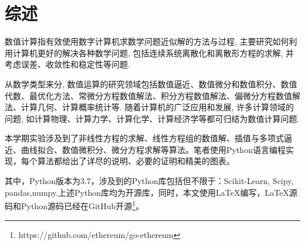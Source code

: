 \section{综述}

数值计算指有效使用数字计算机求数学问题近似解的方法与过程, 主要研究如何利用计算机更好的解决各种数学问题, 包括连续系统离散化和离散形方程的求解, 并考虑误差、收敛性和稳定性等问题.

从数学类型来分, 数值运算的研究领域包括数值逼近、数值微分和数值积分、数值代数、最优化方法、常微分方程数值解法、积分方程数值解法、偏微分方程数值解法、计算几何、计算概率统计等. 随着计算机的广泛应用和发展, 许多计算领域的问题, 如计算物理、计算力学、计算化学、计算经济学等都可归结为数值计算问题.

本学期实验涉及到了非线性方程的求解、线性方程组的数值解、插值与多项式逼近、曲线拟合、数值微积分、微分方程求解等算法。笔者使用Python语言编程实现，每个算法都给出了详尽的说明、必要的证明和精美的图表。

其中，Python版本为3.7，涉及到的Python库包括但不限于：Scikit-Learn, Scipy,  pandas,numpy.上述Python库均为开源库，同时，本文使用\LaTeX 编写，\LaTeX 源码和Python源码已经在GitHub开源\footnote{https://github.com/ethereum/go-ethereum}。